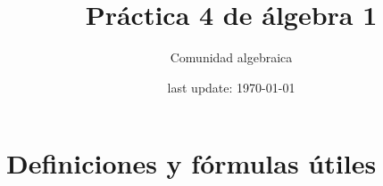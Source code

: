 

\usepackage{polynom} %



\pagestyle{empty} %

\title{Práctica 4 de álgebra 1} %
\author{Comunidad algebraica} %
\date{last update: \today} %

\maketitle  %
\section{Definiciones y fórmulas útiles}

